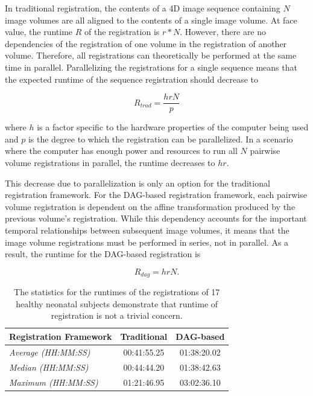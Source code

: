 In traditional registration, the contents of a 4D image sequence containing $N$ image volumes are all aligned to the contents of a single image volume. At face value, the runtime $R$ of the registration is $r*N$. However, there are no dependencies of the registration of one volume in the registration of another volume. Therefore, all registrations can theoretically be performed at the same time in parallel. Parallelizing the registrations for a single sequence means that the expected runtime of the sequence registration should decrease to 

\begin{equation}
R_{trad} = \frac{hrN}{p}
\end{equation} 

\noindent where $h$ is a factor specific to the hardware properties of the computer being used and $p$ is the degree to which the registration can be parallelized. In a scenario where the computer has enough power and resources to run all $N$ pairwise volume registrations in parallel, the runtime decreases to $hr$. 

This decrease due to parallelization is only an option for the traditional registration framework. For the DAG-based registration framework, each pairwise volume registration is dependent on the affine transformation produced by the previous volume's registration. While this dependency accounts for the important temporal relationships between subsequent image volumes, it means that the image volume registrations must be performed in series, not in parallel. As a result, the runtime for the DAG-based registration is

\begin{equation}
R_{dag} = hrN.
\end{equation}

\begin{table}
\centering
\caption{The statistics for the runtimes of the registrations of 17 healthy neonatal subjects demonstrate that runtime of registration is not a trivial concern.}
\label{tab:runtime-example}
\begin{tabular}{|l|c|c|}
\hline
\textbf{Registration Framework} & \textbf{Traditional} & \textbf{DAG-based} \\ \hline
\textit{Average (HH:MM:SS)}     & 00:41:55.25          & 01:38:20.02        \\ \hline
\textit{Median (HH:MM:SS)}      & 00:44:44.20          & 01:38:42.63        \\ \hline
\textit{Maximum (HH:MM:SS)}     & 01:21:46.95          & 03:02:36.10        \\ \hline
\end{tabular}
\vspace{0.05\textwidth}
\end{table}

